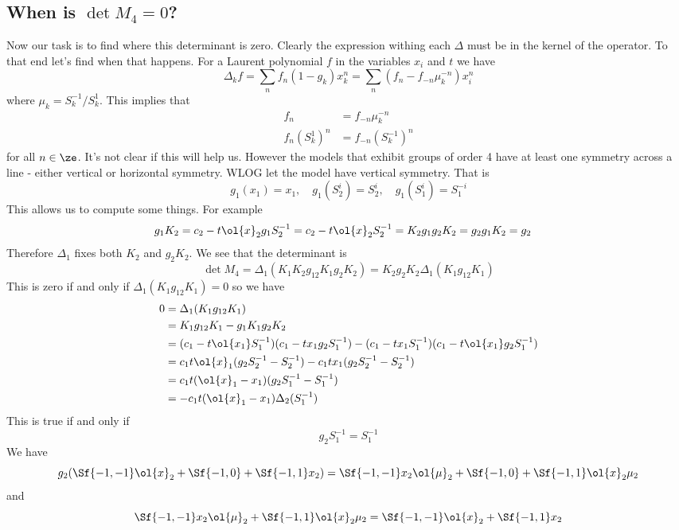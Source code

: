 \subsection{When is $\det M_4 = 0$?}

  Now our task is to find where this determinant is zero. Clearly the expression withing each $\Delta$ must be in the kernel of the operator. To that end let's find when that happens. For a Laurent polynomial $f$ in the variables $x_i$ and $t$ we have
\[
	\Delta_k f = \sum_n f_n (1-g_k)x_k^n = \sum_n (f_n - f_{-n}\mu_k^{-n})x_i^n
\]
where $\mu_k = S_k^{-1}/S_k^1$. This implies that
\begin{align*}
	f_{n} &= f_{-n} \mu_k^{-n}\\
	f_{n} (S_k^1)^n &= f_{-n}(S_k^{-1})^n
\end{align*}
for all $n \in \ze$. It's not clear if this will help us. However the models that exhibit groups of order 4 have at least one symmetry across a line - either vertical or horizontal symmetry. WLOG let the model have vertical symmetry. That is 
\[
	g_1(x_1) = x_1, \quad g_1(S_2^i) = S_2^i,\quad g_1(S_1^i) = S_1^{-i}
\]
This allows us to compute some things. For example
\begin{align*}
	g_1 K_2 &= c_2 - t\ol{x}_2 g_1S_2^{-1} = c_2 - t\ol{x}_2 S_2^{-1} = K_2
	g_1g_2K_2 = g_2 g_1 K_2 = g_2
\end{align*}
Therefore $\Delta_1$ fixes both $K_2$ and $g_2K_2$.
We see that the determinant is
\[
	\det M_4 = \Delta_1  (K_1K_2 g_{12}K_1 g_2K_2) = K_2 g_2K_2 \Delta_1  (K_1 g_{12}K_1)
\]
This is zero if and only if $\Delta_1  (K_1 g_{12}K_1) = 0$ so we have
\begin{align*}
	0&=\Delta_1  (K_1 g_{12}K_1) \\
	&= K_1g_{12}K_1 - g_1 K_1 g_2 K_2 \\
	&= (c_1-t\ol{x_1}S_1^{-1})(c_1-tx_1g_2S_1^{-1})-(c_1-tx_1S_1^{-1})(c_1-t\ol{x_1}g_2S_1^{-1})\\
	&= c_1 t \ol{x}_1 (g_2 S_2^{-1} - S_2^{-1}) - c_1 t x_1 (g_2 S_2^{-1} - S_2^{-1})\\
	&= c_1 t (\ol{x}_1-x_1)(g_2 S_1^{-1}-S_1^{-1})\\
	& = -c_1 t(\ol{x}_1-x_1)\Delta_2(S_1^{-1})
\end{align*}
This is true if and only if
\[
	g_2 S_1^{-1} = S_1^{-1}
\]
We have
\[
	g_2 (\Sf{-1,-1}\ol{x}_2+\Sf{-1,0}+\Sf{-1,1}x_2) = \Sf{-1,-1}x_2 \ol{\mu}_2+\Sf{-1,0}+\Sf{-1,1}\ol{x}_2\mu_2
\]
and
\[
	\Sf{-1,-1}x_2 \ol{\mu}_2+\Sf{-1,1}\ol{x}_2\mu_2 = \Sf{-1,-1}\ol{x}_2+\Sf{-1,1}x_2
\]
